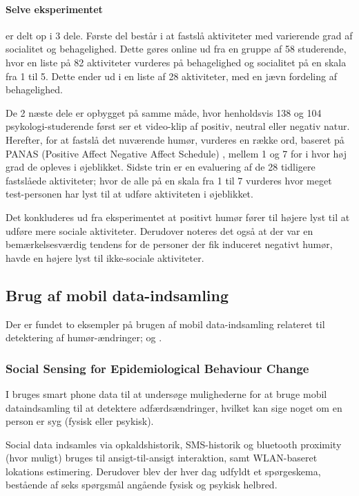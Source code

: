 \paragraph{Selve eksperimentet} er delt op i 3 dele.
Første del består i at fastslå aktiviteter med varierende grad af socialitet og behagelighed.
Dette gøres online ud fra en gruppe af 58 studerende, hvor en liste på 82 aktiviteter vurderes på behagelighed og socialitet på en skala fra 1 til 5.
Dette ender ud i en liste af 28 aktiviteter, med en jævn fordeling af behagelighed.

De 2 næste dele er opbygget på samme måde, hvor henholdsvis 138 og 104 psykologi-studerende først ser et video-klip af positiv, neutral eller negativ natur.
Herefter, for at fastslå det nuværende humør, vurderes en række ord, baseret på PANAS (Positive Affect Negative Affect Schedule) \cite{panas}, mellem 1 og 7 for i hvor høj grad de opleves i øjeblikket.
Sidste trin er en evaluering af de 28 tidligere fastslåede aktiviteter; hvor de alle på en skala fra 1 til 7 vurderes hvor meget test-personen har lyst til at udføre aktiviteten i øjeblikket.

Det konkluderes ud fra eksperimentet at positivt humør fører til højere lyst til at udføre mere sociale aktiviteter.
Derudover noteres det også at der var en bemærkelsesværdig tendens for de personer der fik induceret negativt humør, havde en højere lyst til ikke-sociale aktiviteter.

\subsection{Brug af mobil data-indsamling}
Der er fundet to eksempler på brugen af mobil data-indsamling relateret til detektering af humør-ændringer; \citet{social_sensing} og \citet{social_sensing_2}.

\subsubsection{Social Sensing for Epidemiological Behaviour Change}
I \citet{social_sensing} bruges smart phone data til at undersøge mulighederne for at bruge mobil dataindsamling til at detektere adfærdsændringer, hvilket kan sige noget om en person er syg (fysisk eller psykisk).

Social data indsamles via opkaldshistorik, SMS-historik og bluetooth proximity (hvor muligt) bruges til ansigt-til-ansigt interaktion, samt WLAN-baseret lokations estimering.
Derudover blev der hver dag udfyldt et spørgeskema, bestående af seks spørgsmål angående fysisk og psykisk helbred.

